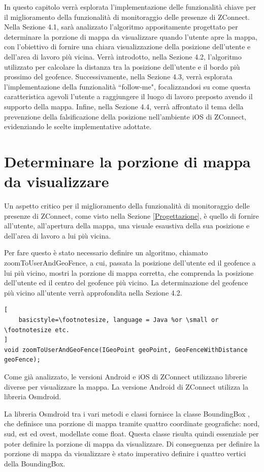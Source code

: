 In questo capitolo verrà esplorata l'implementazione delle funzionalità chiave per il miglioramento della funzionalità di monitoraggio delle presenze di ZConnect. Nella Sezione 4.1, sarà analizzato l'algoritmo appositamente progettato per determinare la porzione di mappa da visualizzare quando l'utente apre la mappa, con l'obiettivo di fornire una chiara visualizzazione della posizione dell'utente e dell'area di lavoro più vicina. Verrà introdotto, nella Sezione 4.2, l'algoritmo utilizzato per calcolare la distanza tra la posizione dell'utente e il bordo più prossimo del geofence. Successivamente, nella Sezione 4.3, verrà esplorata l'implementazione della funzionalità ``follow-me", focalizzandosi su come questa caratteristica agevoli l'utente a raggiungere il luogo di lavoro preposto avendo il supporto della mappa. Infine, nella Sezione 4.4, verrà affrontato il tema della prevenzione della falsificazione della posizione nell'ambiente iOS di ZConnect, evidenziando le scelte implementative adottate.

\section{Determinare la porzione di mappa da visualizzare}
Un aspetto critico per il miglioramento della funzionalità di monitoraggio delle presenze di ZConnect, come visto nella Sezione \ref{Progettazione}, è quello di fornire all'utente, all'apertura della mappa, una visuale esaustiva della sua posizione e dell'area di lavoro a lui più vicina.

Per fare questo è stato necessario definire un algoritmo, chiamato zoomToUserAndGeoFence, a cui, passata la posizione dell'utente ed il geofence a lui più vicino, mostri la porzione di mappa corretta, che comprenda la posizione dell'utente ed il centro del geofence più vicino.
La determinazione del geofence più vicino all'utente verrà approfondita nella Sezione 4.2.

\begin{lstlisting}[
    basicstyle=\footnotesize, language = Java %or \small or \footnotesize etc.
]
void zoomToUserAndGeoFence(IGeoPoint geoPoint, GeoFenceWithDistance geoFence);
\end{lstlisting}

Come già analizzato, le versioni Android e iOS di ZConnect utilizzano librerie diverse per visualizzare la mappa. La versione Android di ZConnect utilizza la libreria Osmdroid.

La libreria Osmdroid tra i vari metodi e classi fornisce la classe BoundingBox \cite{BoundingBox}, che definisce una porzione di mappa tramite quattro coordinate geografiche: nord, sud, est ed ovest, modellate come float. Questa classe risulta quindi essenziale per poter definire la porzione di mappa da visualizzare. Di conseguenza per definire la porzione di mappa da visualizzare è stato imperativo definire i quattro vertici della BoundingBox.

